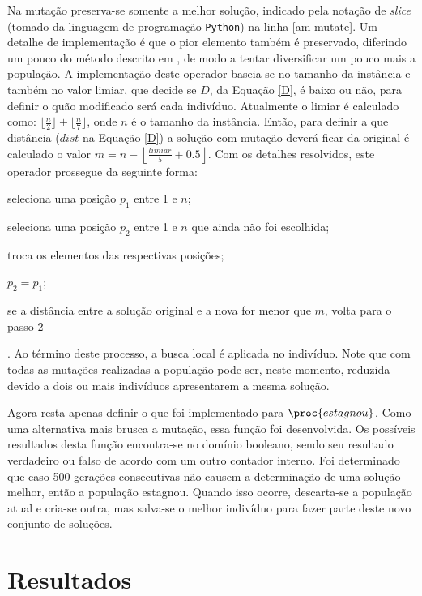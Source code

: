 Na mutação preserva-se somente a melhor solução, indicado pela notação
de \textit{slice} (tomado da linguagem de programação \texttt{Python})
na linha \ref{am-mutate}. Um detalhe de implementação é que o pior
elemento também é preservado, diferindo um pouco do método descrito em
\cite{merz_freisleben}, de modo a tentar diversificar um pouco mais a
população. A implementação deste operador baseia-se no tamanho da
instância e também no valor limiar,
que decide se $D$, da Equação \ref{D}, é baixo ou não, para definir o
quão modificado será cada indivíduo. Atualmente o limiar é calculado
como: $\lfloor\frac{n}{2}\rfloor
+\lfloor\frac{n}{7}\rfloor$, onde $n$ é o tamanho da
instância. Então, para definir a que
distância ($dist$ na Equação \ref{D}) a solução com mutação deverá
ficar da original é calculado o valor $m = n -
\left\lfloor\frac{limiar}{5} + 0.5\right\rfloor$. Com os detalhes
resolvidos, este operador prossegue da seguinte
forma: \begin{inparaenum}[(1)] \item seleciona uma posição $p_1$ entre 1 e
  $n$; \item seleciona uma posição $p_2$ entre 1 e $n$ que ainda não
  foi escolhida; \item troca os elementos das respectivas posições; \item
  $p_2 = p_1$; \item se a
  distância entre a solução original e a nova for menor que $m$, volta
  para o passo 2\end{inparaenum}. Ao término deste processo, a busca
local é aplicada no indivíduo. Note que com todas as mutações
realizadas a população pode ser, neste momento, reduzida devido a dois
ou mais indivíduos apresentarem a mesma solução.

Agora resta apenas definir o que foi implementado para
$\proc{estagnou}$. Como uma alternativa mais brusca a mutação, essa
função foi desenvolvida. Os possíveis resultados desta função
encontra-se no domínio booleano, sendo seu resultado verdadeiro ou
falso de acordo com um outro contador interno. Foi determinado que
caso 500 gerações consecutivas não causem a determinação de uma
solução melhor, então a população estagnou. Quando isso ocorre,
descarta-se a população atual e cria-se outra, mas salva-se o
melhor indivíduo para fazer parte deste novo conjunto de soluções.


\section{Resultados}

